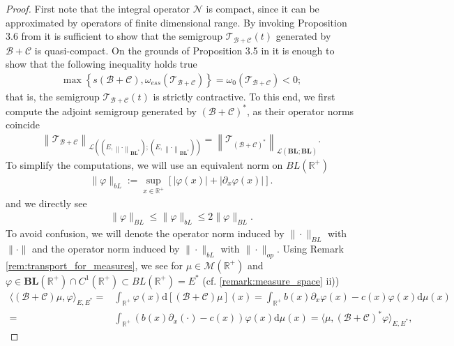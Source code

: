 \documentclass[12pt,a4paper]{amsart}
\newcommand{\ud}{\mathrm{d}}
\newcommand{\BL}{\mathbf{BL}}
\newcommand{\BLN}{\mathbf{BL}}
\newcommand{\norma}[1]{{\left \|#1\right \|}}
\renewcommand{\phi}{\varphi}
\newcommand{\R}{\mathbb{R}}
\begin{document}
\begin{proof}
First note that the integral operator $\mathcal{N}$ is compact, since it can be approximated by operators of finite dimensional range. By invoking Proposition 3.6 from \cite[Ch.V]{EngelNagel} it is sufficient to show that the semigroup $\mathcal{T}_{\mathcal{B}+\mathcal{C}}(t)$ generated by $\mathcal{B}+\mathcal{C}$ is quasi-compact. On the grounds of  Proposition 3.5 in \cite[Ch.V]{EngelNagel} it is enough to show that the following inequality holds true 
    \begin{align*}
    \max\left\{s(\mathcal{B}+\mathcal{C}),\omega_{ess}\left(\mathcal{T}_{\mathcal{B}+\mathcal{C}}\right)\right\}=\omega_0\left(\mathcal{T}_{\mathcal{B}+\mathcal{C}}\right)<0;
    \end{align*}
that is, the semigroup $\mathcal{T}_{\mathcal{B}+\mathcal{C}}(t)$ is strictly contractive. To this end, we first compute the adjoint semigroup generated by $(\mathcal{B}+\mathcal{C})^*$, as their operator norms coincide
    \begin{align}
    \label{duality}
    \norma{\mathcal{T}_{\mathcal{B}+\mathcal{C}}}_{\mathcal L\left(( E, \norma{\cdot}_{\BLN^*});(E, \norma{\cdot}_{\BLN^*})\right)} = \norma{\mathcal{T}_{(\mathcal{B}+\mathcal{C})^*}}_{\mathcal L\left( \BL;\BL\right)}.
    \end{align}
To simplify the computations, we will use an equivalent norm on $BL(\R^+)$
    \begin{align}
    \label{new_BL}
    \|\phi\|_{bL}:=\sup_{x\in \R^+}\left[|\phi(x)|+|\partial_x \phi(x)|\right].
\end{align}
and we directly see
    \begin{align}
    \label{equivalence_constants}
    \|\varphi\|_{BL}\leq \|\varphi\|_{bL}\leq 2\|\varphi\|_{BL}.
    \end{align}
To avoid confusion, we will denote the operator norm induced by $\|\cdot\|_{BL}$ with $\|\cdot\|$ and the operator norm induced by $\|\cdot\|_{bL}$ with $\|\cdot\|_{op}$. Using Remark \ref{rem:transport_for_measures}, we see for $\mu\in \mathcal{M}(\R^+)$ and $\varphi\in \BL(\R^+)\cap C^1(\R^+)\subset BL(\R^+)=E^*$ (cf. \ref{remark:measure_space} ii))
    \begin{align*}
    \langle (\mathcal{B}+\mathcal{C})\mu,\varphi\rangle_{E,E^*}=&\int_{\R^+}\varphi(x)\ud[(\mathcal{B}+\mathcal{C})\mu](x)=\int_{\R^+}b(x)\partial_x\varphi(x)-c(x)\varphi(x)\ud\mu(x)\\
    =&\int_{\R^+}(b(x)\partial_x(\cdot)-c(x))\varphi(x)\ud\mu(x)=\langle\mu,(\mathcal{B}+\mathcal{C})^*\varphi\rangle_{E,E^*}, 

\end{align*}
\end{proof}
\end{document}
